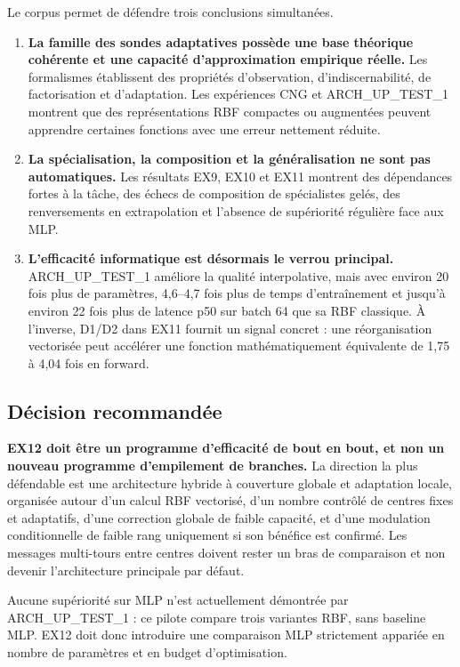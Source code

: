 \documentclass[11pt,a4paper]{article}
\begin{document}
Le corpus permet de défendre trois conclusions simultanées.

\begin{enumerate}
  \item \textbf{La famille des sondes adaptatives possède une base théorique cohérente et une capacité d'approximation empirique réelle.} Les formalismes établissent des propriétés d'observation, d'indiscernabilité, de factorisation et d'adaptation. Les expériences CNG et ARCH\_UP\_TEST\_1 montrent que des représentations RBF compactes ou augmentées peuvent apprendre certaines fonctions avec une erreur nettement réduite.
  \item \textbf{La spécialisation, la composition et la généralisation ne sont pas automatiques.} Les résultats EX9, EX10 et EX11 montrent des dépendances fortes à la tâche, des échecs de composition de spécialistes gelés, des renversements en extrapolation et l'absence de supériorité régulière face aux MLP.
  \item \textbf{L'efficacité informatique est désormais le verrou principal.} ARCH\_UP\_TEST\_1 améliore la qualité interpolative, mais avec environ 20 fois plus de paramètres, 4,6--4,7 fois plus de temps d'entraînement et jusqu'à environ 22 fois plus de latence p50 sur batch 64 que sa RBF classique. À l'inverse, D1/D2 dans EX11 fournit un signal concret : une réorganisation vectorisée peut accélérer une fonction mathématiquement équivalente de 1,75 à 4,04 fois en forward.
\end{enumerate}

\subsection{Décision recommandée}

\textbf{EX12 doit être un programme d'efficacité de bout en bout, et non un nouveau programme d'empilement de branches.} La direction la plus défendable est une architecture hybride à couverture globale et adaptation locale, organisée autour d'un calcul RBF vectorisé, d'un nombre contrôlé de centres fixes et adaptatifs, d'une correction globale de faible capacité, et d'une modulation conditionnelle de faible rang uniquement si son bénéfice est confirmé. Les messages multi-tours entre centres doivent rester un bras de comparaison et non devenir l'architecture principale par défaut.

Aucune supériorité sur MLP n'est actuellement démontrée par ARCH\_UP\_TEST\_1 : ce pilote compare trois variantes RBF, sans baseline MLP. EX12 doit donc introduire une comparaison MLP strictement appariée en nombre de paramètres et en budget d'optimisation.
\end{document}
